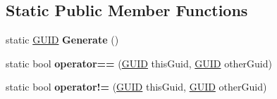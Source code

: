 \subsection*{Static Public Member Functions}
\begin{DoxyCompactItemize}
\item 
\hypertarget{struct_hattori_game2_1_1_core_1_1_g_u_i_d_ad360767c80b2018ba74d4c703e704fd4}{}static \hyperlink{struct_hattori_game2_1_1_core_1_1_g_u_i_d}{G\+U\+I\+D} {\bfseries Generate} ()\label{struct_hattori_game2_1_1_core_1_1_g_u_i_d_ad360767c80b2018ba74d4c703e704fd4}

\item 
\hypertarget{struct_hattori_game2_1_1_core_1_1_g_u_i_d_a26b5ac18fb1f9706162ec243b69ce33f}{}static bool {\bfseries operator==} (\hyperlink{struct_hattori_game2_1_1_core_1_1_g_u_i_d}{G\+U\+I\+D} this\+Guid, \hyperlink{struct_hattori_game2_1_1_core_1_1_g_u_i_d}{G\+U\+I\+D} other\+Guid)\label{struct_hattori_game2_1_1_core_1_1_g_u_i_d_a26b5ac18fb1f9706162ec243b69ce33f}

\item 
\hypertarget{struct_hattori_game2_1_1_core_1_1_g_u_i_d_a6f12bf847c9ac996c90c14c069ba30ef}{}static bool {\bfseries operator!=} (\hyperlink{struct_hattori_game2_1_1_core_1_1_g_u_i_d}{G\+U\+I\+D} this\+Guid, \hyperlink{struct_hattori_game2_1_1_core_1_1_g_u_i_d}{G\+U\+I\+D} other\+Guid)\label{struct_hattori_game2_1_1_core_1_1_g_u_i_d_a6f12bf847c9ac996c90c14c069ba30ef}

\end{DoxyCompactItemize}
